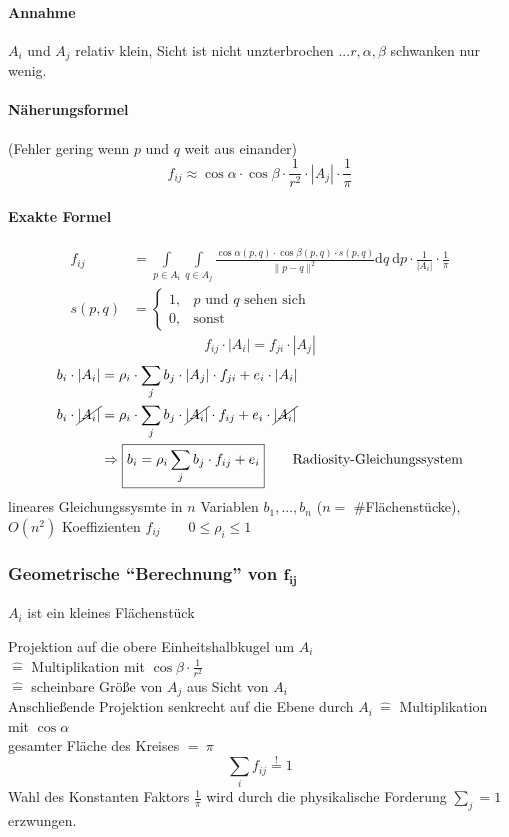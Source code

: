 \paragraph*{Annahme} $A_i$ und $A_j$ relativ klein, Sicht ist nicht unzterbrochen $... r, \alpha, \beta$ schwanken nur wenig.
\paragraph*{Näherungsformel} (Fehler gering wenn $p$ und $q$ weit aus einander)
\[f_{ij} \approx \cos \alpha \cdot \cos \beta \cdot \frac{1}{r^2} \cdot |A_j| \cdot \frac{1}{\pi} \]
\paragraph*{Exakte Formel}
\begin{align*}
f_{ij} &= \int\limits_{p \in A_i} \int\limits_{q \in A_j} \frac{\cos \alpha (p,q) \cdot \cos \beta (p,q) \cdot s(p,q)}{\|p - q\|^2} \mathrm{d}q\ \mathrm{d}p
	\cdot \frac{1}{|A_i|} \cdot \frac{1}{\pi}\\
s(p,q) &= \begin{cases}
		1, & \text{$p$ und $q$ sehen sich}\\
		0, &  \text{sonst}
          \end{cases}
\end{align*}
\[\boxed{f_{ij} \cdot |A_i| = f_{ji} \cdot |A_j|}\]
\begin{align*}
b_i \cdot |A_i| &= \rho_i \cdot \sum\limits_j b_j \cdot |A_j| \cdot f_{ji} + e_i \cdot |A_i|\\
b_i \cdot \cancel{|A_i|} &= \rho_i \cdot \sum\limits_j b_j \cdot \cancel{|A_i|} \cdot f_{ij} + e_i \cdot \cancel{|A_i|}\\
	&\Rightarrow \boxed{b_i = \rho_i \sum\limits_j b_j \cdot f_{ij} + e_i} \qquad \text{Radiosity-Gleichungssystem}
\end{align*}
lineares Gleichungssysmte in $n$ Variablen $b_1, ..., b_n$ ($n =$ \#Flächenstücke), $O(n^2)$ Koeffizienten $f_{ij} \qquad 0 \le \rho_i \le 1$

\subsubsection{Geometrische "`Berechnung"' von $\boldsymbol{f_{ij}}$}
$A_i$ ist ein kleines Flächenstück
\begin{center}
\end{center}
Projektion auf die obere Einheitshalbkugel um $A_i$\\
$\hat =$ Multiplikation mit $\cos \beta \cdot \frac{1}{r^2}$\\
$\hat =$ scheinbare Größe von $A_j$ aus Sicht von $A_i$\\
Anschließende Projektion senkrecht auf die Ebene durch $A_i\ \hat =$ Multiplikation mit $\cos \alpha$\\
gesamter Fläche des Kreises $=\ \pi$
\[\sum\limits_i f_{ij} \stackrel{\mathbf{!}}= 1\]
Wahl des Konstanten Faktors $\frac{1}{\pi}$ wird durch die physikalische Forderung $\sum\limits_{j} = 1$ erzwungen.

